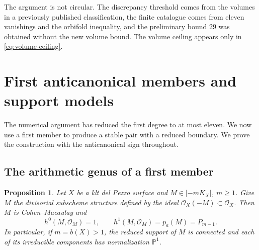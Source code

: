 \documentclass[12pt,a4paper]{article}
\numberwithin{equation}{section}
\newtheorem{proposition}[theorem]{Proposition}
\theoremstyle{definition}
\newcommand{\PP}{\mathbb P}
\newcommand{\OO}{\mathcal O}
\begin{document}
The argument is not circular. The discrepancy threshold comes from
the volumes in a previously published classification, the finite
catalogue comes from eleven vanishings and the orbifold inequality,
and the preliminary bound \(29\) was obtained without the new
volume bound. The volume ceiling appears only in
\eqref{eq:volume-ceiling}.

\section{First anticanonical members and support models}\label{sec:support}

The numerical argument has reduced the first degree to at most eleven.
We now use a first member to produce a stable pair with a reduced
boundary. We prove the construction with the anticanonical sign
throughout.

\subsection{The arithmetic genus of a first member}

\begin{proposition}\label{prop:first-genus}
Let \(X\) be a klt del Pezzo surface and
\(M\in|-mK_X|\), \(m\geq1\).
Give \(M\) the divisorial subscheme structure defined by the ideal
\(\OO_X(-M)\subset\OO_X\).
Then \(M\) is Cohen--Macaulay and
\[
 h^0(M,\OO_M)=1,\qquad
 h^1(M,\OO_M)=p_a(M)=P_{m-1}.
\]
In particular, if \(m=b(X)>1\), the reduced support of \(M\) is
connected and each of its irreducible components has normalization
\(\PP^1\).
\end{proposition}
\end{document}
